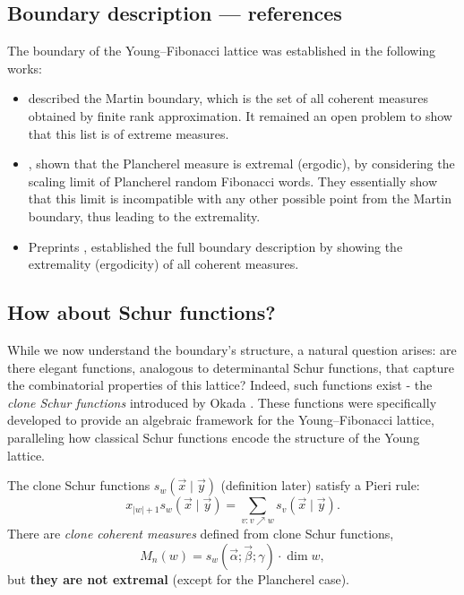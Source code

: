 \documentclass[letterpaper,11pt,oneside,reqno]{article}
\numberwithin{equation}{section}
\theoremstyle{definition}
\begin{document}
\subsection{Boundary description --- references}

The boundary of the Young--Fibonacci lattice
was established in the following works:
\begin{itemize}
	\item \cite{KerovGoodman1997} described the Martin
		boundary, which is the set of all coherent measures
		obtained by finite rank approximation. It remained an
		open problem to show that this list is of extreme measures.
	\item \cite{gnedin2000plancherel}, shown that the Plancherel measure is extremal
		(ergodic), by considering the scaling limit of
		Plancherel random Fibonacci words. They essentially show that this limit is incompatible
		with any other possible point from the Martin boundary, thus
		leading to the extremality.
	\item Preprints
		\cite{BochkovEvtushevsky2020},
		\cite{Evtushevsky2020PartII}
		established the full boundary description by showing
		the extremality (ergodicity) of all coherent measures.
\end{itemize}

\subsection{How about Schur functions?}

While we now understand the boundary's structure, a natural question arises: are there
elegant functions, analogous to determinantal Schur functions, that capture the
combinatorial properties of this lattice? Indeed, such functions exist - the
\emph{clone Schur functions} introduced by Okada \cite{okada1994algebras}. These
functions were specifically developed to provide an algebraic framework for the
Young--Fibonacci lattice, paralleling how classical Schur functions encode the
structure of the Young lattice.

The clone Schur functions $s_w(\vec x\mid \vec y)$
(definition later)
satisfy a Pieri rule:
\begin{equation*}
	x_{|w|+1}s_w(\vec x\mid \vec y)=\sum_{v\colon v\nearrow w}s_v(\vec x\mid \vec y).
\end{equation*}
There are \emph{clone coherent measures} defined from clone Schur functions,
\begin{equation*}
	M_n(w)=s_w(\vec \alpha;\vec \beta;\gamma)\cdot \dim w,
\end{equation*}
but \textbf{they are not extremal} (except for the Plancherel case).
\end{document}

